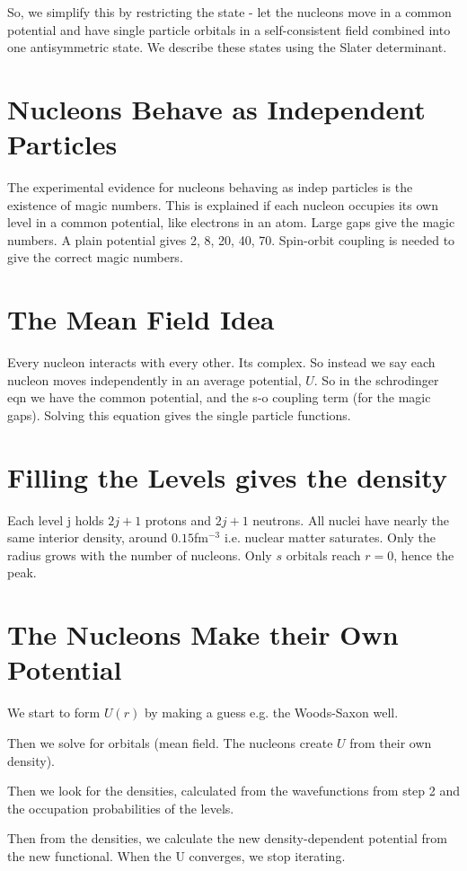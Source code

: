 So, we simplify this by restricting the state - let the nucleons move in a common potential and have single particle orbitals in a self-consistent field combined into one antisymmetric state. We describe these states using the Slater determinant. 

\section{Nucleons Behave as Independent Particles}
The experimental evidence for nucleons behaving as indep particles is the existence of magic numbers. This is explained if each nucleon occupies its own level in a common potential, like electrons in an atom. Large gaps give the magic numbers. A plain potential gives 2, 8, 20, 40, 70. Spin-orbit coupling is needed to give the correct magic numbers.

\section{The Mean Field Idea}
Every nucleon interacts with every other. Its complex. So instead we say each nucleon moves independently in an average potential, \(U\). So in the schrodinger eqn we have the common potential, and the s-o coupling term (for the magic gaps). Solving this equation gives the single particle functions.

\section{Filling the Levels gives the density}
Each level j holds \(2j+1\) protons and \(2j+1\) neutrons. All nuclei have nearly the same interior density, around \(0.15\)fm\(^{-3}\) i.e. nuclear matter saturates. Only the radius grows with the number of nucleons. Only \(s\) orbitals reach \(r=0\), hence the  peak.

\section{The Nucleons Make their Own Potential}
We start to form \(U(r)\) by making a guess e.g. the Woods-Saxon well. 

Then we solve for orbitals (mean field. The nucleons create \(U\) from their own density).

Then we look for the densities, calculated from the wavefunctions from step 2 and the occupation probabilities of the levels.

Then from the densities, we calculate the new density-dependent potential from the new functional. When the U converges, we stop iterating. 


